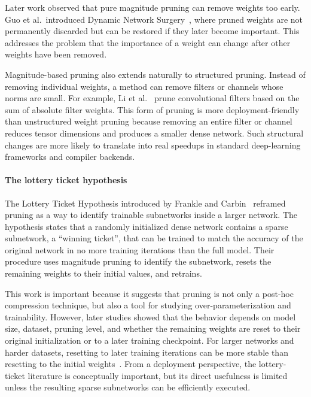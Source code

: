 \documentclass[12pt,a4paper]{report}
\begin{document}
Later work observed that pure magnitude pruning can remove weights too early. Guo et al.\
introduced Dynamic Network Surgery~\cite{guo2016dynamic}, where pruned weights are not
permanently discarded but can be restored if they later become important. This addresses the
problem that the importance of a weight can change after other weights have been removed.

Magnitude-based pruning also extends naturally to structured pruning. Instead of removing
individual weights, a method can remove filters or channels whose norms are small. For example,
Li et al.~\cite{li2016pruning} prune convolutional filters based on the sum of absolute filter weights.
This form of pruning is more deployment-friendly than unstructured weight pruning because
removing an entire filter or channel reduces tensor dimensions and produces a smaller dense
network. Such structural changes are more likely to translate into real speedups in standard
deep-learning frameworks and compiler backends.

\paragraph{The lottery ticket hypothesis}
The Lottery Ticket Hypothesis introduced by Frankle and Carbin~\cite{frankle2018lottery}
reframed pruning as a way to identify trainable subnetworks inside a larger network. The
hypothesis states that a randomly initialized dense network contains a sparse subnetwork, a
``winning ticket'', that can be trained to match the accuracy of the original network in no more
training iterations than the full model. Their procedure uses magnitude pruning to identify the
subnetwork, resets the remaining weights to their initial values, and retrains.

This work is important because it suggests that pruning is not only a post-hoc compression
technique, but also a tool for studying over-parameterization and trainability. However, later
studies showed that the behavior depends on model size, dataset, pruning level, and whether the
remaining weights are reset to their original initialization or to a later training checkpoint. For
larger networks and harder datasets, resetting to later training iterations can be more stable than
resetting to the initial weights~\cite{frankle2019stabilizing}. From a deployment perspective, the
lottery-ticket literature is conceptually important, but its direct usefulness is limited unless the
resulting sparse subnetworks can be efficiently executed.
\end{document}
